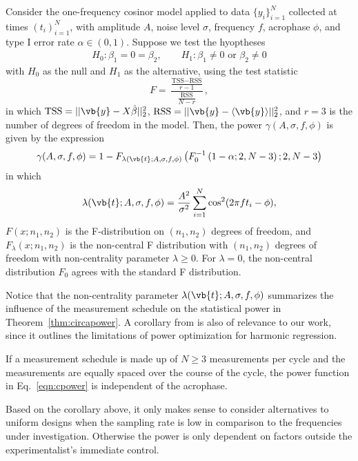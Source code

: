 \begin{theorem}
  \label{thm:circapower}
Consider the one-frequency cosinor model applied to data $\{y_i\}_{i=1}^{N}$ collected at times $(t_i)_{i=1}^{N}$, with amplitude $A$, noise level $\sigma$, frequency $f$, acrophase $\phi$, and type I error rate $\alpha\in (0,1)$. Suppose we test the hyoptheses
\begin{align}
    H_0 : \beta_1=0=\beta_2, \quad\quad H_1 : \beta_1\neq0 \textrm{ or } \beta_2 \neq 0 
\end{align}
with $H_0$ as the null and $H_1$ as the alternative, using the test statistic
\begin{equation}
F = \frac{ \frac{\textrm{TSS} - \textrm{RSS}}{r-1} }{ \frac{\textrm{RSS}}{N-r}},
\end{equation}
in which $\textrm{TSS} = || \vb{y} - X\hat{\beta}||_2^2$, $\textrm{RSS} =  ||\vb{y}-\langle\vb{y} \rangle||_2^2$, and $r=3$ is the number of degrees of freedom in the model. Then, the power $\gamma(A,\sigma,f,\phi)$ is given by the expression
\begin{align}
  \gamma(A,\sigma,f,\phi)=1- F_{\lambda(\vb{t};A,\sigma,f,\phi)}\left(F_0^{-1}\left( 1-\alpha;2,N-3\right);2,N-3\right) \label{eqn:cpower}
\end{align}
in which
\begin{align}
\lambda(\vb{t};A,\sigma,f,\phi)=\frac{A^2}{\sigma^2}\sum_{i=1}^{N}  \cos^2(2\pi ft_i - \phi),\label{eqn:lambda}
\end{align}
$F(x;n_1,n_2)$ is the F-distribution on $(n_1,n_2)$ degrees of freedom, and $F_\lambda(x;n_1,n_2)$ is the non-central F distribution with $(n_1,n_2)$ degrees of freedom with non-centrality parameter $\lambda\geq 0$. For $\lambda=0$, the non-central distribution $F_0$ agrees with the standard F distribution.
\end{theorem}
Notice that the non-centrality parameter $\lambda(\vb{t};A,\sigma,f,\phi)$  summarizes the influence of the measurement schedule on the statistical power in Theorem~\ref{thm:circapower}. A corollary from \cite{wei2023circpower} is also of relevance to our work, since it outlines the limitations of power optimization for harmonic regression.
\begin{corollary}\label{cor:unif}
If a measurement schedule is made up of $N\geq3$ measurements per cycle and the measurements are equally spaced over the course of the cycle, the power function in Eq.~\eqref{eqn:cpower} is independent of the acrophase.
\end{corollary}
Based on the corollary above, it only makes sense to consider alternatives to uniform designs when the sampling rate is low in comparison to the frequencies under investigation. Otherwise the power is only dependent on factors outside the experimentalist's immediate control. 


